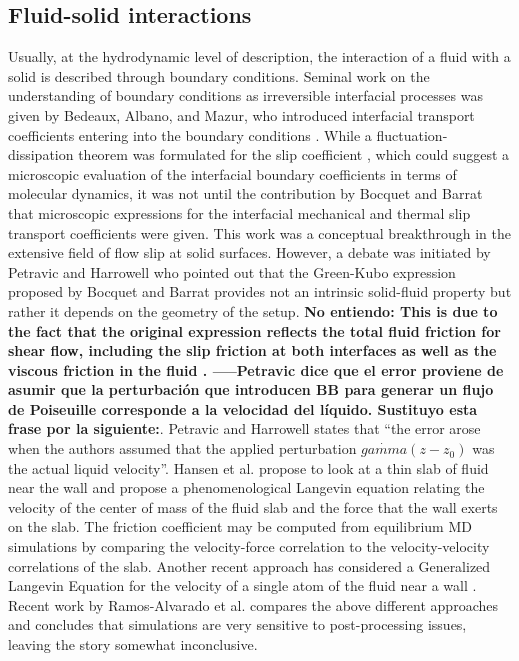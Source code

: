 \documentclass[b5paper,openright,11pt]{book}
\newcommand{\Note}[1]{{\bf \color{red}#1}}    %
\newcommand{\Pendiente}[1]{{\color{green}#1}} %
\begin{document}
\subsection{Fluid-solid  interactions}
Usually, at the hydrodynamic level  of description, the interaction of
a fluid with a solid is described through boundary conditions. Seminal
work  on  the understanding  of  boundary  conditions as  irreversible
interfacial processes  was given  by Bedeaux,  Albano, and  Mazur, who
introduced  interfacial  transport   coefficients  entering  into  the
boundary       conditions      \cite{Bedeaux1976}.        While      a
fluctuation-dissipation   theorem   was   formulated  for   the   slip
coefficient  \cite{Bedeaux1977},  which  could suggest  a  microscopic
evaluation  of  the  interfacial  boundary coefficients  in  terms  of
molecular dynamics, it  was not until the contribution  by Bocquet and
Barrat  that microscopic  expressions for  the interfacial  mechanical
\cite{Bocquet1994}  and   thermal  \cite{Barrat2003}   slip  transport
coefficients were given.   This work was a  conceptual breakthrough in
the extensive field of flow slip at solid surfaces.  However, a debate
was  initiated  by  Petravic  and  Harrowell  \cite{Petravic2007}  who
pointed out  that the  Green-Kubo expression  proposed by  Bocquet and
Barrat provides  not an intrinsic  solid-fluid property but  rather it
depends on the geometry of the setup.
\Note{No entiendo: This is due to the fact that the
original expression reflects the total  fluid friction for shear flow,
including the slip friction at both  interfaces as well as the viscous
friction  in   the  fluid  \cite{Hansen2011,Kannam2011}. -----Petravic dice que el error proviene de asumir que la perturbación que introducen BB para generar un flujo de Poiseuille corresponde a la velocidad del líquido. Sustituyo esta frase por la siguiente:}. 
\Pendiente{Petravic and Harrowell states that ``the error arose when the authors assumed that the applied perturbation $\dot{gamma}(z-z_0)$ was the actual liquid velocity''.}
Hansen  et
al. \cite{Hansen2011} propose to look at a thin slab of fluid near the
wall  and propose  a phenomenological  Langevin equation  relating the
velocity of the  center of mass of  the fluid slab and  the force that
the wall exerts on the slab. The friction coefficient may be computed
from  equilibrium  MD  simulations  by  comparing  the  velocity-force
correlation to the velocity-velocity correlations of the slab. Another
recent approach has considered a Generalized Langevin Equation for the
velocity of a  single atom of the fluid near  a wall \cite{Huang2014}.
Recent  work  by   Ramos-Alvarado  et  al.   \cite{Ramos-Alvarado2016}
compares the above different approaches and concludes that simulations
are  very  sensitive  to  post-processing  issues,  leaving  the  story
somewhat inconclusive.
\end{document}
